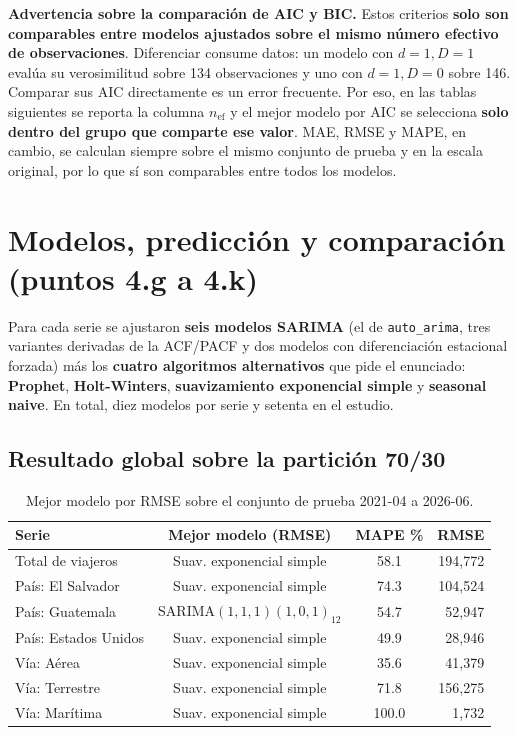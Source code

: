 \documentclass[12pt,letterpaper]{article}
\newcommand{\seccion}[1]{\section{#1}}
\newcommand{\subseccion}[1]{\subsection{#1}}
\begin{document}
\textbf{Advertencia sobre la comparación de AIC y BIC.} Estos criterios \textbf{solo son
comparables entre modelos ajustados sobre el mismo número efectivo de observaciones}.
Diferenciar consume datos: un modelo con $d=1, D=1$ evalúa su verosimilitud sobre 134
observaciones y uno con $d=1, D=0$ sobre 146. Comparar sus AIC directamente es un error
frecuente. Por eso, en las tablas siguientes se reporta la columna $n_{\text{ef}}$ y el mejor
modelo por AIC se selecciona \textbf{solo dentro del grupo que comparte ese valor}. MAE, RMSE y
MAPE, en cambio, se calculan siempre sobre el mismo conjunto de prueba y en la escala original,
por lo que sí son comparables entre todos los modelos.

\seccion{Modelos, predicción y comparación (puntos 4.g a 4.k)}

Para cada serie se ajustaron \textbf{seis modelos SARIMA} (el de \texttt{auto\_arima}, tres
variantes derivadas de la ACF/PACF y dos modelos con diferenciación estacional forzada) más los
\textbf{cuatro algoritmos alternativos} que pide el enunciado: \textbf{Prophet},
\textbf{Holt-Winters}, \textbf{suavizamiento exponencial simple} y \textbf{seasonal naive}. En
total, diez modelos por serie y setenta en el estudio.

\subseccion{Resultado global sobre la partición 70/30}

\begin{table}[H]
\centering
\small
\begin{tabular}{lccr}
\toprule
\textbf{Serie} & \textbf{Mejor modelo (RMSE)} & \textbf{MAPE \%} & \textbf{RMSE} \\
\midrule
Total de viajeros      & Suav. exponencial simple & 58.1 & 194{,}772 \\
País: El Salvador      & Suav. exponencial simple & 74.3 & 104{,}524 \\
País: Guatemala        & SARIMA$(1,1,1)(1,0,1)_{12}$ & 54.7 & 52{,}947 \\
País: Estados Unidos   & Suav. exponencial simple & 49.9 & 28{,}946 \\
Vía: Aérea             & Suav. exponencial simple & 35.6 & 41{,}379 \\
Vía: Terrestre         & Suav. exponencial simple & 71.8 & 156{,}275 \\
Vía: Marítima          & Suav. exponencial simple & 100.0 & 1{,}732 \\
\bottomrule
\end{tabular}
\caption{Mejor modelo por RMSE sobre el conjunto de prueba 2021-04 a 2026-06.}
\end{table}
\end{document}
